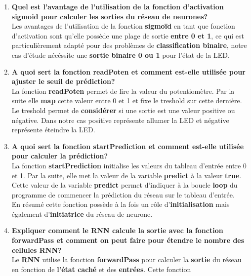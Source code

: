 \begin{enumerate}
{  } \\
  \item {
    \textbf{Quel est l'avantage de l'utilisation de la fonction d'activation sigmoid pour calculer les sorties du réseau de neurones?}\vspace{0.2cm}\\
    Les avantages de l'utilisation de la fonction \textbf{sigmoïd} en tant que fonction d'activation sont qu'elle possède une plage de sortie \textbf{entre 0 et 1}, ce 
    qui est particulièrement adapté pour des problèmes de \textbf{classification binaire}, notre cas d'étude nécéssite une \textbf{sortie binaire 0 ou 1} pour l'état de la LED.\@
  } \\
  \item {
    \textbf{A quoi sert la fonction readPoten et comment est-elle utilisée pour ajuster le seuil de prédiction?} \vspace{0.2cm}\\
    La fonction \textbf{readPoten} permet de lire la valeur du potentiomètre. Par la suite elle \textbf{map} cette valeur entre 0 et 1 et fixe le treshold sur cette dernière.\\
    Le treshold permet de \textbf{considérer} si une sortie est une valeur positive ou négative. Dans notre cas positive représente allumer la LED et négative représente éteindre la LED.\@
  } \\
  \item {
    \textbf{A quoi sert la fonction startPrediction et comment est-elle utilisée pour calculer la prédiction?} \vspace{0.2cm}\\
    La fonction \textbf{startPrediction} initialise les valeurs du tableau d'entrée entre 0 et 1. Par la suite, elle met la valeur de la variable \textbf{predict} à la valeur \textbf{true}.
    Cette valeur de la variable \textbf{predict} permet d'indiquer à la boucle \textbf{loop} du programme de commencer la prédiction du réseau sur le tableau d'entrée.\\
    En résumé cette fonction possède à la fois un rôle d'\textbf{initialisation} mais également d'\textbf{initiatrice} du réseau de neurone.
  } \\
  \item {
    \textbf{Expliquer comment le RNN calcule la sortie avec la fonction forwardPass et comment on peut faire pour étendre le nombre des cellules RNN?} \vspace{0.2cm}\\
    Le \textbf{RNN} utilise la fonction \textbf{forwardPass} pour calculer la \textbf{sortie} du réseau en fonction de \textbf{l'état caché} et des \textbf{entrées}. Cette fonction 
}
\end{enumerate}
